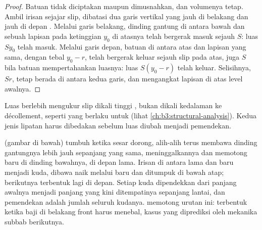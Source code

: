 \begin{proof}
Batuan tidak diciptakan maupun dimusnahkan, dan volumenya tetap. Ambil irisan
sejajar slip, dibatasi dua garis vertikal yang jauh di belakang dan jauh di depan
. Melalui garis belakang, dinding gantung di antara  bawah
dan sebuah lapisan pada ketinggian $y_0$ di atasnya telah bergerak masuk sejauh $S$: luas
$Sy_0$ telah masuk. Melalui garis depan, batuan di antara  atas
dan lapisan yang sama, dengan tebal $y_0 - r$, telah bergerak keluar sejauh slip pada
 atas, juga $S$ bila batuan mempertahankan luasnya: luas $S(y_0 - r)$
telah keluar. Selisihnya, $Sr$, tetap berada di antara kedua garis, dan mengangkat
lapisan di atas level awalnya.
\end{proof}

Luas berlebih  mengukur slip dikali tinggi
, bukan dikali kedalaman ke décollement, seperti yang berlaku untuk
 (lihat \cref{ch:b3:structural-analysis}). Kedua jenis lipatan
harus dibedakan sebelum luas diubah menjadi pemendekan.


 (gambar di bawah) tumbuh ketika sesar dorong, alih-alih terus membawa dinding gantungnya
lebih jauh sepanjang  yang sama, meninggalkannya dan memotong  baru di dinding bawahnya,
di depan  lama. Irisan di antara  lama dan baru menjadi
kuda, dibawa naik melalui  baru dan ditumpuk di bawah atap;  berikutnya
terbentuk lagi di depan. Setiap kuda dipendekkan dari panjang awalnya menjadi
panjang yang kini ditempatinya sepanjang lantai, dan pemendekan  adalah
jumlah seluruh kudanya.  memotong urutan ini: terbentuk
ketika baji di belakang front harus menebal, kasus yang diprediksi oleh mekanika
subbab berikutnya.


